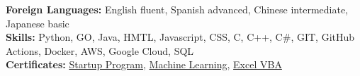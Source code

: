 
\textbf{Foreign Languages:}
English fluent,
Spanish advanced,
Chinese intermediate,
Japanese basic
\vspace{-0.2em}\\
\textbf{Skills:}
Python,
GO,
Java,
HMTL, Javascript, CSS,
C, C++, C\#,
GIT,
GitHub Actions,
Docker,
AWS,
Google Cloud,
SQL
\vspace{-0.2em}\\
\textbf{Certificates:}
{\color{linkBlue} \href{https://e-certificado.com/login/visualizar?c=664024A5B7D718B4639950}{Startup Program}},
{\color{linkBlue} \href{https://cursos.alura.com.br/degree/certificate/98f57b77-ffe3-4062-b69c-7259b0fd74c6}{Machine Learning}},
{\color{linkBlue} \href{https://cursos.alura.com.br/degree/certificate/68d6f5b3-3a07-4fac-9f6b-f42f04e131ca}{Excel VBA}}

